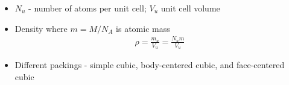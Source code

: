 \documentclass[11pt]{article}
\begin{document}
\begin{itemize}
\begin{center}
  \end{center}
\item $N_u$ - number of atoms per unit cell; $V_u$ unit cell volume
\item Density where $m = M/N_A$ is atomic mass
  \begin{align*}
    \rho = \frac{m_u}{V_u} = \frac{N_um}{V_u}
  \end{align*}
\item Different packings - simple cubic, body-centered cubic, and face-centered cubic
\end{itemize}
\end{document}
